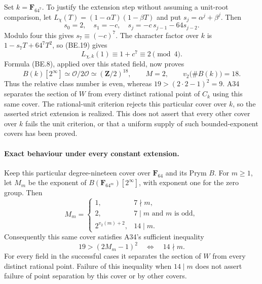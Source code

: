 \documentclass[11pt,a4paper]{article}
\begin{document}
Set $k=\mathbf F_{64^7}$. To justify the extension step
without assuming a unit-root comparison, let
$L_\chi(T)=(1-\alpha T)(1-\beta T)$ and put
$s_j=\alpha^j+\beta^j$. Then
\[
 s_0=2,\quad s_1=-c,\quad
 s_j=-c\,s_{j-1}-64s_{j-2}.
 \tag{BE.20}
\]
Modulo four this gives $s_7\equiv(-c)^7$.
The character factor over $k$ is
$1-s_7T+64^7T^2$, so (BE.19) gives
\[
 L_{\chi,k}(1)\equiv1+c^7\equiv2\pmod4.
\]
Formula (BE.8), applied over this stated field, now proves
\[
 B(k)[2^\infty]\simeq\mathcal O/2\mathcal O
                  \simeq(\mathbf Z/2)^{18},
 \qquad M=2,
 \qquad v_2\bigl(\#B(k)\bigr)=18.
 \tag{BE.21}
\]
Thus the relative class number is even, whereas
$19>(2\cdot2-1)^2=9$. A34 separates the section of $W$
from every distinct rational point of $C_k$ using this same
cover. The rational-unit criterion rejects this particular
cover over $k$, so the asserted strict extension is realized.
This does not assert that every other cover over $k$ fails
the unit criterion, or that a uniform supply of such
bounded-exponent covers has been proved.


\paragraph{Exact behaviour under every constant extension.}
Keep this particular degree-nineteen cover over $\mathbf F_{64}$
and its Prym $B$.  For $m\geq1$, let $M_m$ be the exponent of
$B(\mathbf F_{64^m})[2^\infty]$, with exponent one for the zero
group.  Then
\[
 M_m=
 \begin{cases}
  1,&7\nmid m,\\
  2,&7\mid m\text{ and }m\text{ is odd},\\
  2^{v_2(m)+2},&14\mid m.
 \end{cases}                                                   \tag{BE.22}
\]
Consequently this same cover satisfies A34's sufficient inequality
\[
                    19>(2M_m-1)^2
                    \quad\Longleftrightarrow\quad14\nmid m.   \tag{BE.23}
\]
For every field in the successful cases it separates the section
of $W$ from every distinct rational point.  Failure of this
inequality when $14\mid m$ does not assert failure of point
separation by this cover or by other covers.
\end{document}
